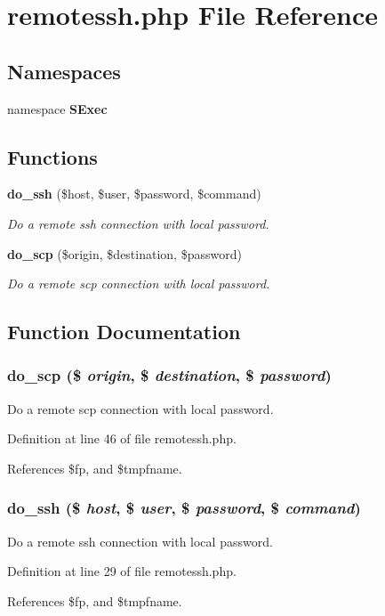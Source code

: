 \section{remotessh.php File Reference}
\label{remotessh_8php}
\subsection*{Namespaces}
\begin{CompactItemize}
\item 
namespace {\bf SExec}
\end{CompactItemize}
\subsection*{Functions}
\begin{CompactItemize}
\item 
{\bf do\_\-ssh} (\$host, \$user, \$password, \$command)
\begin{CompactList}\small\item\em Do a remote ssh connection with local password. \item\end{CompactList}\item 
{\bf do\_\-scp} (\$origin, \$destination, \$password)
\begin{CompactList}\small\item\em Do a remote scp connection with local password. \item\end{CompactList}\end{CompactItemize}


\subsection{Function Documentation}
\subsubsection{\setlength{\rightskip}{0pt plus 5cm}do\_\-scp (\$ {\em origin}, \$ {\em destination}, \$ {\em password})}\label{remotessh_8php_a1}


Do a remote scp connection with local password. 



Definition at line 46 of file remotessh.php.

References \$fp, and \$tmpfname.
\subsubsection{\setlength{\rightskip}{0pt plus 5cm}do\_\-ssh (\$ {\em host}, \$ {\em user}, \$ {\em password}, \$ {\em command})}\label{remotessh_8php_a0}


Do a remote ssh connection with local password. 



Definition at line 29 of file remotessh.php.

References \$fp, and \$tmpfname.